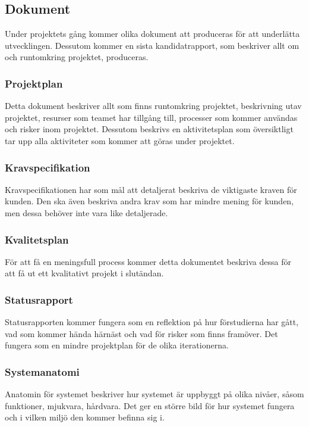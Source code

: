 \subsection{Dokument}
Under projektets gång kommer olika dokument att produceras för att underlätta utvecklingen.
Dessutom kommer en sista kandidatrapport, som beskriver allt om och runtomkring projektet,
produceras.

\subsubsection*{Projektplan}
Detta dokument beskriver allt som finns runtomkring projektet, beskrivning utav projektet, 
resurser som teamet har tillgång till, processer som kommer användas och risker inom projektet.
Dessutom beskrivs en aktivitetsplan som översiktligt tar upp alla aktiviteter som kommer att
göras under projektet.

\subsubsection*{Kravspecifikation}
Kravspecifikationen har som mål att detaljerat beskriva de viktigaste kraven för kunden.
Den ska även beskriva andra krav som har mindre mening för kunden, men dessa behöver inte vara
like detaljerade.

\subsubsection*{Kvalitetsplan}
För att få en meningsfull process kommer detta dokumentet beskriva dessa för att få ut ett 
kvalitativt projekt i slutändan.

\subsubsection*{Statusrapport}
Statusrapporten kommer fungera som en reflektion på hur förstudierna har gått, vad som kommer
hända härnäst och vad för risker som finns framöver. Det fungera som en mindre projektplan för
de olika iterationerna.

\subsubsection*{Systemanatomi}
Anatomin för systemet beskriver hur systemet är uppbyggt på olika nivåer, såsom funktioner, 
mjukvara, hårdvara. Det ger en större bild för hur systemet fungera och i vilken miljö den kommer
befinna sig i.

